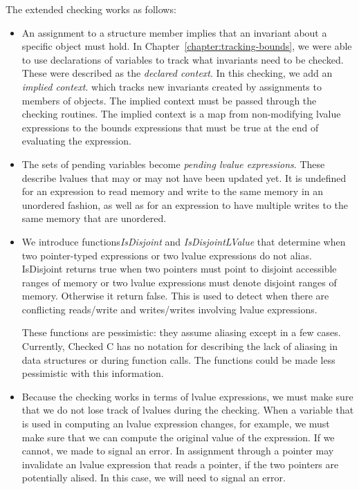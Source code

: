 The extended checking works as follows:
\begin{itemize}
\item An assignment to a structure member implies that an invariant about a specific
object must hold.  In Chapter~\ref{chapter:tracking-bounds}, we were able to use
declarations of variables to track what invariants need to be checked.    These were
described as  the {\em declared context}.  In this checking, we add an {\em implied context}.
which tracks new invariants created by assignments to members of objects.  The implied
context must be passed through the checking routines.   The implied context is a map
from non-modifying lvalue expressions to the bounds expressions that must be true at the
end of evaluating the expression.
\item The sets of pending variables become {\em pending lvalue expressions}.   These
describe lvalues that may or may not have been updated yet.   It is undefined for an expression
to read memory and write to the same memory in an unordered fashion, as well as for an 
expression to have multiple writes to the same memory that are unordered.  
\item We introduce functions{\em IsDisjoint} and {\em IsDisjointLValue} that determine when 
two pointer-typed expressions or two lvalue expressions do not alias. IsDisjoint returns
true when two  pointers must point to disjoint accessible ranges of memory  or two lvalue
expressions must denote disjoint ranges of memory. Otherwise it return false. This is used
to detect when there are  conflicting reads/write and writes/writes involving lvalue expressions.

These functions are pessimistic: they assume aliasing except in a few cases.  Currently, 
Checked C has no notation for describing the lack of aliasing in data structures or during
function calls. The functions could be made less pessimistic with this information.

\item Because the checking works in terms of lvalue expressions, we must make sure that we 
do not lose track of lvalues during the checking.  When a variable that is used in computing an
lvalue expression changes, for example, we must make sure that we can compute the original
value of the expression.  If we cannot, we made to signal an error.  In assignment through a pointer
may invalidate an lvalue expression that reads a pointer, if the two pointers are potentially alised.
In this case, we will need to signal an error.
\end{itemize}



